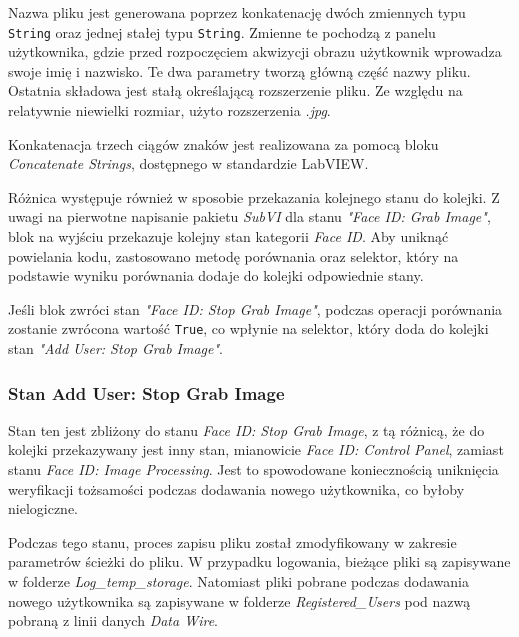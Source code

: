 \documentclass{report}
\begin{document}
Nazwa pliku jest generowana poprzez konkatenację dwóch zmiennych typu \texttt{String} oraz jednej stałej typu \texttt{String}. Zmienne te pochodzą z panelu użytkownika, gdzie przed rozpoczęciem akwizycji obrazu użytkownik wprowadza swoje imię i nazwisko. Te dwa parametry tworzą główną część nazwy pliku. Ostatnia składowa jest stałą określającą rozszerzenie pliku. Ze względu na relatywnie niewielki rozmiar, użyto rozszerzenia \textit{.jpg}.

Konkatenacja trzech ciągów znaków jest realizowana za pomocą bloku \textit{Concatenate Strings}, dostępnego w standardzie LabVIEW.

Różnica występuje również w sposobie przekazania kolejnego stanu do kolejki. Z uwagi na pierwotne napisanie pakietu \textit{SubVI} dla stanu \textit{"Face ID: Grab Image"}, blok na wyjściu przekazuje kolejny stan kategorii \textit{Face ID}. Aby uniknąć powielania kodu, zastosowano metodę porównania oraz selektor, który na podstawie wyniku porównania dodaje do kolejki odpowiednie stany.

Jeśli blok zwróci stan \textit{"Face ID: Stop Grab Image"}, podczas operacji porównania zostanie zwrócona wartość \texttt{True}, co wpłynie na selektor, który doda do kolejki stan \textit{"Add User: Stop Grab Image"}.


\subsubsection*{\large Stan Add User: Stop Grab Image}


Stan ten jest zbliżony do stanu \textit{Face ID: Stop Grab Image}, z tą różnicą, że do kolejki przekazywany jest inny stan, mianowicie \textit{Face ID: Control Panel}, zamiast stanu \textit{Face ID: Image Processing}. Jest to spowodowane koniecznością uniknięcia weryfikacji tożsamości podczas dodawania nowego użytkownika, co byłoby nielogiczne.

Podczas tego stanu, proces zapisu pliku został zmodyfikowany w zakresie parametrów ścieżki do pliku. W przypadku logowania, bieżące pliki są zapisywane w folderze \textit{Log\_temp\_storage}. Natomiast pliki pobrane podczas dodawania nowego użytkownika są zapisywane w folderze \textit{Registered\_Users} pod nazwą pobraną z linii danych \textit{Data Wire}.
\end{document}
